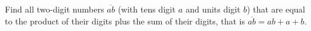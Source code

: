 Find all two-digit numbers $\overline{ab}$ (with tens digit $a$ and units digit $b$) that are equal to the product of their digits plus the sum of their digits, that is $\overline{ab}=ab+a+b$.
